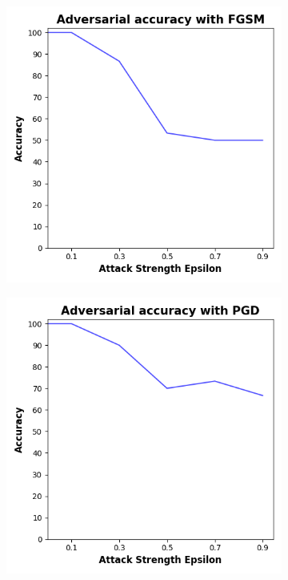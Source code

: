 \begin{figure}[!h]
  \centering

  \begin{subfigure}{0.45\textwidth}
      \includegraphics[width=\linewidth]{figures/evaluation_results/iris/pqc/figures/none-fgsm.png}
      \label{fig:iris3}
  \end{subfigure} \qquad
  \begin{subfigure}{0.45\textwidth}
      \includegraphics[width=\linewidth]{figures/evaluation_results/iris/pqc/figures/none-pgd.png}
      \label{fig:iris4}
  \end{subfigure}


\end{figure}
